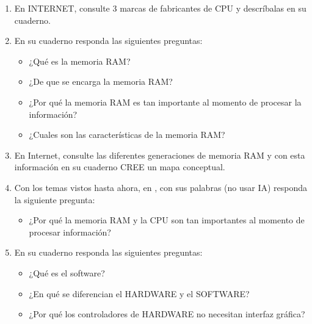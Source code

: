 \documentclass[letterpaper,10pt,spanish]{sphinxmanual}
\begin{document}
\begin{enumerate}
\item {} 
\sphinxAtStartPar
En INTERNET, consulte 3 marcas de fabricantes de CPU y descríbalas en su cuaderno.

\item {} 
\sphinxAtStartPar
En su cuaderno responda las siguientes preguntas:
\begin{itemize}
\item {} 
\sphinxAtStartPar
¿Qué es la memoria RAM?

\item {} 
\sphinxAtStartPar
¿De que se encarga la memoria RAM?

\item {} 
\sphinxAtStartPar
¿Por qué la memoria RAM es tan importante al momento de procesar la información?

\item {} 
\sphinxAtStartPar
¿Cuales son las características de la memoria RAM?

\end{itemize}

\item {} 
\sphinxAtStartPar
En Internet, consulte las diferentes generaciones de memoria RAM y con esta información en su cuaderno CREE un mapa conceptual.

\item {} 
\sphinxAtStartPar
Con los temas vistos hasta ahora, en , con sus palabras (no usar IA) responda la siguiente pregunta:
\begin{itemize}
\item {} 
\sphinxAtStartPar
¿Por qué la memoria RAM y la CPU son tan importantes al momento de procesar información?

\end{itemize}

\item {} 
\sphinxAtStartPar
En su cuaderno responda las siguientes preguntas:
\begin{itemize}
\item {} 
\sphinxAtStartPar
¿Qué es el software?

\item {} 
\sphinxAtStartPar
¿En qué se diferencian el HARDWARE y el SOFTWARE?

\item {} 
\sphinxAtStartPar
¿Por qué los controladores de HARDWARE no necesitan interfaz gráfica?

\end{itemize}


\end{enumerate}
\end{document}
